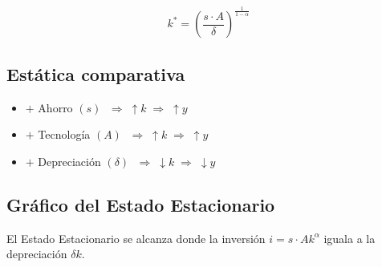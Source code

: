 \documentclass[11pt,a4paper]{article}
\begin{document}
\begin{resultadobox}
\begin{equation}
    k^{*} = \left(\frac{s \cdot A}{\delta}\right)^{\frac{1}{1-\alpha}}
\end{equation}
\end{resultadobox}

\subsection{Estática comparativa}

\begin{explicacionbox}
\begin{itemize}
    \item $+$ Ahorro $(s)$ $\;\Rightarrow\; \uparrow k \;\Rightarrow\; \uparrow y$
    \item $+$ Tecnología $(A)$ $\;\Rightarrow\; \uparrow k \;\Rightarrow\; \uparrow y$
    \item $+$ Depreciación $(\delta)$ $\;\Rightarrow\; \downarrow k \;\Rightarrow\; \downarrow y$
\end{itemize}
\end{explicacionbox}

\subsection{Gráfico del Estado Estacionario}

El Estado Estacionario se alcanza donde la inversión $i = s \cdot A k^{\alpha}$ iguala a la depreciación $\delta k$.
\end{document}
